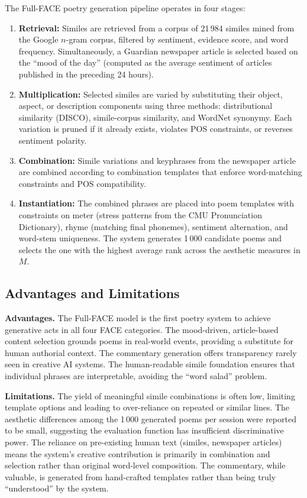 \documentclass[conference]{IEEEtran}
\begin{document}
The Full-FACE poetry generation pipeline operates in four stages:

\begin{enumerate}
    \item \textbf{Retrieval:} Similes are retrieved from a corpus of 21\,984 similes mined from the Google $n$-gram corpus, filtered by sentiment, evidence score, and word frequency. Simultaneously, a Guardian newspaper article is selected based on the ``mood of the day'' (computed as the average sentiment of articles published in the preceding 24 hours).
    \item \textbf{Multiplication:} Selected similes are varied by substituting their object, aspect, or description components using three methods: distributional similarity (DISCO), simile-corpus similarity, and WordNet synonymy. Each variation is pruned if it already exists, violates POS constraints, or reverses sentiment polarity.
    \item \textbf{Combination:} Simile variations and keyphrases from the newspaper article are combined according to combination templates that enforce word-matching constraints and POS compatibility.
    \item \textbf{Instantiation:} The combined phrases are placed into poem templates with constraints on meter (stress patterns from the CMU Pronunciation Dictionary), rhyme (matching final phonemes), sentiment alternation, and word-stem uniqueness. The system generates 1\,000 candidate poems and selects the one with the highest average rank across the aesthetic measures in $M$.
\end{enumerate}

\subsection{Advantages and Limitations}

\textbf{Advantages.}
The Full-FACE model is the first poetry system to achieve generative acts in all four FACE categories. The mood-driven, article-based content selection grounds poems in real-world events, providing a substitute for human authorial context. The commentary generation offers transparency rarely seen in creative AI systems. The human-readable simile foundation ensures that individual phrases are interpretable, avoiding the ``word salad'' problem.

\textbf{Limitations.}
The yield of meaningful simile combinations is often low, limiting template options and leading to over-reliance on repeated or similar lines. The aesthetic differences among the 1\,000 generated poems per session were reported to be small, suggesting the evaluation function has insufficient discriminative power. The reliance on pre-existing human text (similes, newspaper articles) means the system's creative contribution is primarily in combination and selection rather than original word-level composition. The commentary, while valuable, is generated from hand-crafted templates rather than being truly ``understood'' by the system.
\end{document}
